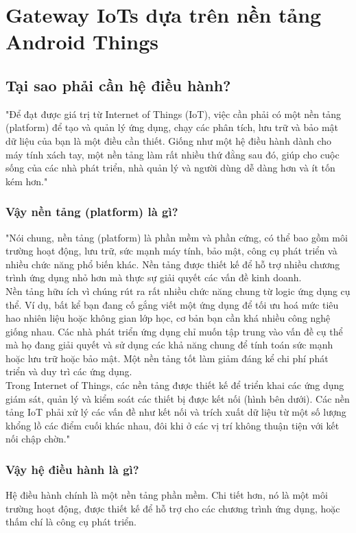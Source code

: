 \chapter{Gateway IoTs dựa trên nền tảng Android Things}
\label{chapter3}
\section{Tại sao phải cần hệ điều hành?}
"Để đạt được giá trị từ Internet of Things (IoT), việc cần phải có một nền tảng (platform) để tạo và quản lý ứng dụng, chạy các phân tích, lưu trữ và bảo mật dữ liệu của bạn là một điều cần thiết. Giống như một hệ điều hành dành cho máy tính xách tay, một nền tảng làm rất nhiều thứ đằng sau đó, giúp cho cuộc sống của các nhà phát triển, nhà quản lý và người dùng dễ dàng hơn và ít tốn kém hơn."\cite{tl4}

\subsection{Vậy nền tảng (platform) là gì?}
"Nói chung, nền tảng (platform) là phần mềm và phần cứng, có thể bao gồm môi trường hoạt động, lưu trữ, sức mạnh máy tính, bảo mật, công cụ phát triển và nhiều chức năng phổ biến khác. Nền tảng được thiết kế để hỗ trợ nhiều chương trình ứng dụng nhỏ hơn mà thực sự giải quyết các vấn đề kinh doanh.\\

Nền tảng hữu ích vì chúng rút ra rất nhiều chức năng chung từ logic ứng dụng cụ thể. Ví dụ, bất kể bạn đang cố gắng viết một ứng dụng để tối ưu hoá mức tiêu hao nhiên liệu hoặc không gian lớp học, cơ bản bạn cần khá nhiều công nghệ giống nhau. Các nhà phát triển ứng dụng chỉ muốn tập trung vào vấn đề cụ thể mà họ đang giải quyết và sử dụng các khả năng chung để tính toán sức mạnh hoặc lưu trữ hoặc bảo mật. Một nền tảng tốt làm giảm đáng kể chi phí phát triển và duy trì các ứng dụng.\\

Trong Internet of Things, các nền tảng được thiết kế để triển khai các ứng dụng giám sát, quản lý và kiểm soát các thiết bị được kết nối (hình bên dưới). Các nền tảng IoT phải xử lý các vấn đề như kết nối và trích xuất dữ liệu từ một số lượng khổng lồ các điểm cuối khác nhau, đôi khi ở các vị trí không thuận tiện với kết nối chập chờn."\cite{tl4}
\subsection{Vậy hệ điều hành là gì?}
Hệ điều hành chính là một nền tảng phần mềm. Chi tiết hơn, nó là một môi trường hoạt động, được thiết kế để hỗ trợ cho các chương trình ứng dụng, hoặc thấm chí là công cụ phát triển.\cite{tl5}\\


